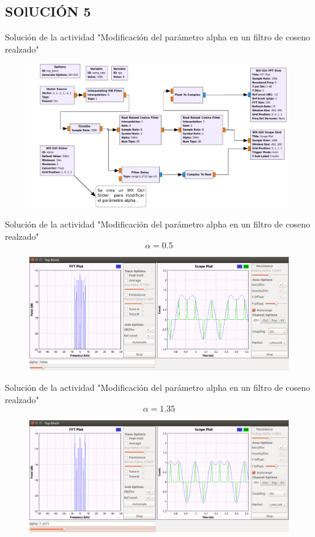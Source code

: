 \subsection{SOlUCIÓN 5}


\begin{frame}{Solución de la actividad "Modificación del parámetro alpha en un filtro de coseno realzado"}
\begin{figure}
\includegraphics[width=.9\textwidth]{soluciones/actividad-5-1/pdf/lab5_7.pdf}
\end{figure}
\end{frame}
\begin{frame}{Solución de la actividad "Modificación del parámetro alpha en un filtro de coseno realzado"}
$$\alpha=0.5$$
\begin{figure}
\includegraphics[width=1.05\textwidth]{soluciones/actividad-5-1/pdf/lab5_8.pdf}
\end{figure}
\end{frame}
\begin{frame}{Solución de la actividad "Modificación del parámetro alpha en un filtro de coseno realzado"}
$$\alpha=1.35$$
\begin{figure}
\includegraphics[width=1.05\textwidth]{soluciones/actividad-5-1/pdf/lab5_9.pdf}
\end{figure}
\end{frame}
